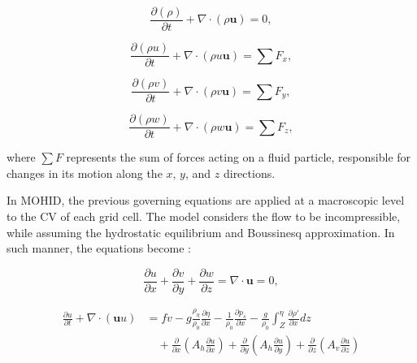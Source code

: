 \begin{equation}\label{eq:cp1_mass}
    \frac{\partial(\rho)}{\partial t} + \nabla \cdot (\rho \mathbf{u}) = 0,
\end{equation}

\begin{equation}\label{eq:cp1_momentumx}
    \frac{\partial(\rho u)}{\partial t} + \nabla \cdot (\rho u \mathbf{u}) = \sum F_{x},
\end{equation}

\begin{equation}\label{eq:cp1_momentumy}
    \frac{\partial(\rho v)}{\partial t} + \nabla \cdot (\rho v \mathbf{u}) = \sum F_{y},
\end{equation}

\begin{equation}\label{eq:cp1_momentumz}
    \frac{\partial(\rho w)}{\partial t} + \nabla \cdot (\rho w \mathbf{u}) = \sum F_{z},
\end{equation}

where $\sum F$ represents the sum of forces acting on a fluid particle, responsible for changes in its motion along the $x$, $y$, and $z$ directions.

In MOHID, the previous governing equations are applied at a macroscopic level to the CV of each grid cell. The model considers the flow to be incompressible, while assuming the hydrostatic equilibrium and Boussinesq approximation. In such manner, the equations become \parencite{martins1998three}:

\begin{equation}\label{eq:cp1_massmohid}
    \frac{\partial u}{\partial x} + \frac{\partial v}{\partial y} + \frac{\partial w}{\partial z} = \nabla \cdot \mathbf{u} = 0,
\end{equation}

\begin{equation}\label{eq:cp1_momentumxmohid}
\begin{aligned}
    \frac{\partial u}{\partial t}
    + \nabla \cdot (\mathbf{u}u)
    &= fv
    - g\frac{\rho_{\eta}}{\rho_0} \frac{\partial \eta}{\partial x}
    - \frac{1}{\rho_0}\frac{\partial p_s}{\partial x}
    - \frac{g}{\rho_0} \int_{Z}^{\eta}\frac{\partial \rho'}{\partial x} dz \\
    &\quad + \frac{\partial}{\partial x}\left( A_h \frac{\partial u}{\partial x}\right)
    + \frac{\partial}{\partial y}\left( A_h \frac{\partial u}{\partial y}\right)
    + \frac{\partial}{\partial z}\left( A_v \frac{\partial u}{\partial z}\right)
\end{aligned}
\end{equation}

